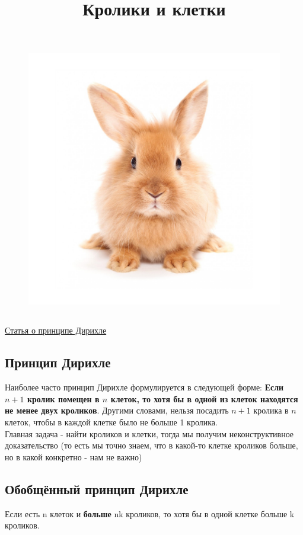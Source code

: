 \documentclass[a4paper,12pt]{article}
\title{Кролики и клетки}
\begin{document}
\maketitle

\begin{figure}[h]
    \raggedleft
    \vspace{-5cm}
    \includegraphics[width=0.25\linewidth]{image.png}
\end{figure}
\subsection*{} \href{https://problems.ru/articles/216.php}{Статья о принципе Дирихле} 
\subsection*{Принцип Дирихле} 
Наиболее часто принцип Дирихле формулируется в следующей форме: \textbf{Если $n + 1$ кролик помещен в $n$ клеток, то хотя бы в одной из клеток находятся не менее двух кроликов}. Другими словами, нельзя посадить $n + 1$ кролика в $n$ клеток, чтобы в каждой клетке было не больше 1 кролика. \\ Главная задача - найти кроликов и клетки, тогда мы получим неконструктивное доказательство (то есть мы точно знаем, что в какой-то клетке кроликов больше, но в какой конкретно - нам не важно)
\subsection*{Обобщённый принцип Дирихле} Если есть n клеток и \textbf{больше} nk кроликов, то хотя бы в одной клетке больше k кроликов.
\end{document}
